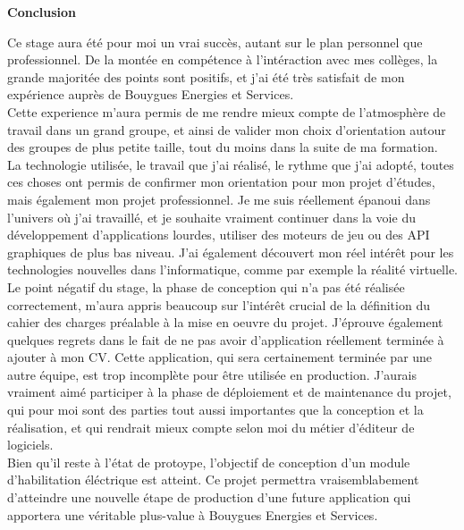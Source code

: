 \documentclass[a4paper]{article}
\begin{document}
    \huge \textbf{Conclusion} \vspace{5pt} \\
   \normalsize
   
    Ce stage aura été pour moi un vrai succès, autant sur le plan personnel que professionnel. De la montée en compétence à l'intéraction avec mes collèges, la grande majoritée des points sont positifs, et j'ai été très satisfait de mon expérience auprès de Bouygues Energies et Services. \\

    Cette experience m'aura permis de me rendre mieux compte de l'atmosphère de travail dans un grand groupe, et ainsi de valider mon choix d'orientation autour des groupes de plus petite taille, tout du moins dans la suite de ma formation. \\

    La technologie utilisée, le travail que j'ai réalisé, le rythme que j'ai adopté, toutes ces choses ont permis de confirmer mon orientation pour mon projet d'études, mais également mon projet professionnel. Je me suis réellement épanoui dans l'univers où j'ai travaillé, et je souhaite vraiment continuer dans la voie du développement d'applications lourdes, utiliser des moteurs de jeu ou des API graphiques de plus bas niveau. J'ai également découvert mon réel intérêt pour les technologies nouvelles dans l'informatique, comme par exemple la réalité virtuelle. \\

    Le point négatif du stage, la phase de conception qui n'a pas été réalisée correctement, m'aura appris beaucoup sur l'intérêt crucial de la définition du cahier des charges préalable à la mise en oeuvre du projet. J'éprouve également quelques regrets dans le fait de ne pas avoir d'application réellement terminée à ajouter à mon CV. Cette application, qui sera certainement terminée par une autre équipe, est trop incomplète pour être utilisée en production. J'aurais vraiment aimé participer à la phase de déploiement et de maintenance du projet, qui pour moi sont des parties tout aussi importantes que la conception et la réalisation, et qui rendrait mieux compte selon moi du métier d'éditeur de logiciels. \\

    Bien qu'il reste à l'état de protoype, l'objectif de conception d'un module d'habilitation éléctrique est atteint. Ce projet permettra vraisemblabement d'atteindre une nouvelle étape de production d'une future application qui apportera une véritable plus-value à Bouygues Energies et Services. \\
\end{document}

